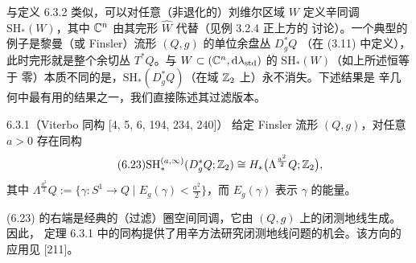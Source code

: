 
与定义 6.3.2 类似，可以对任意（非退化的）刘维尔区域 $W$ 定义辛同调
$\mathrm{SH}_*(W)$，其中 $\mathbb{C}^n$ 由其完形 $\widehat{W}$ 代替（见例 3.2.4 正上方的
讨论）。一个典型的例子是黎曼（或 Finsler）流形 $(Q,g)$ 的单位余盘丛 $D_g^*Q$
（在 (3.11) 中定义），此时完形就是整个余切丛 $T^*Q$。与
$W\subset(\mathbb{C}^n,\mathrm{d}\lambda_{\mathrm{std}})$ 的 $\mathrm{SH}_*(W)$（如上所述恒等于
零）本质不同的是，$\mathrm{SH}_*(D_g^*Q)$（在域 $\mathbb{Z}_2$ 上）永不消失。下述结果是
辛几何中最有用的结果之一，我们直接陈述其过滤版本。

\begin{wthm}{6.3.1（Viterbo 同构 [4, 5, 6, 194, 234, 240]）}
  给定 Finsler 流形 $(Q,g)$，对任意 $a>0$ 存在同构
  \begin{equation}\tag{6.23}
    \mathrm{SH}_*^{(a,\infty)}(D_g^*Q;\mathbb{Z}_2)
    \cong H_*\bigl(\Lambda^{\frac{a^2}{2}}Q;\mathbb{Z}_2\bigr),
  \end{equation}
  其中
  $\Lambda^{\frac{a^2}{2}}Q:=\bigl\{\gamma\colon S^1\to Q\;\big|\;
  E_g(\gamma)<\frac{a^2}{2}\bigr\}$，而 $E_g(\gamma)$ 表示 $\gamma$ 的能量。
\end{wthm}

(6.23) 的右端是经典的（过滤）圈空间同调，它由 $(Q,g)$ 上的闭测地线生成。因此，
定理 6.3.1 中的同构提供了用辛方法研究闭测地线问题的机会。该方向的应用见
[211]。

